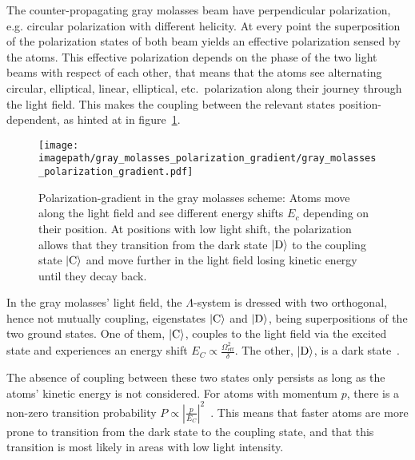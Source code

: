 The counter-propagating gray molasses beam have perpendicular polarization, e.g. circular polarization with different helicity. At every point the superposition of the polarization states of both beam yields an effective polarization sensed by the atoms. This effective polarization depends on the phase of the two light beams with respect of each other, that means that the atoms see alternating circular, elliptical, linear, elliptical, etc.~polarization along their journey through the light field. This makes the coupling between the relevant states position-dependent, as hinted at in figure~\ref{fig:gray_molasses_polarization_gradient}.

\begin{figure}
    \centering
    \texttt{[image: \\imagepath/gray\_molasses\_polarization\_gradient/gray\_molasses\_polarization\_gradient.pdf]}
    \caption{Polarization-gradient in the gray molasses scheme: Atoms move along the light field and see different energy shifts $E_c$ depending on their position. At positions with low light shift, the polarization allows that they transition from the dark state $\Ket{\text{D}}$ to the coupling state $\Ket{\text{C}}$ and move further in the light field losing kinetic energy until they decay back.}
    \label{fig:gray_molasses_polarization_gradient}
\end{figure}

In the gray molasses' light field, the $\Lambda$-system is dressed with two orthogonal, hence not mutually coupling, eigenstates $\Ket{\text{C}}$ and $\Ket{\text{D}}$, being superpositions of the two ground states. One of them, $\Ket{\text{C}}$, couples to the light field via the excited state and experiences an energy shift $E_C \propto \frac{\Omega_\text{eff}^2}{\delta}$. The other, $\Ket{\text{D}}$, is a dark state~\cite{weidemuller_novel_1994,gerken_gray_2016}.

The absence of coupling between these two states only persists as long as the atoms' kinetic energy is not considered. For atoms with momentum $p$, there is a non-zero transition probability $P \propto \left|\frac{p}{E_C} \right|^2$~\cite{weidemuller_novel_1994}. This means that faster atoms are more prone to transition from the dark state to the coupling state, and that this transition is most likely in areas with low light intensity.

